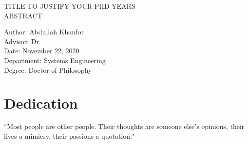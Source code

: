 \documentclass[12pt]{report}
\newcommand{\thesistitle}{TITLE TO JUSTIFY YOUR PHD YEARS}
\newcommand{\thesisname}{Abdullah Khanfor}
\newcommand{\thesischairadvisor}{Dr. }    %
\newcommand{\thesisdepartment}{Systems Engineering}
\newcommand{\thesisdate}{November 22, 2020}
\newcommand{\thesisdegree}{Doctor of Philosophy}
\begin{document}
\newpage
\doublespacing

\begin{center}
    {\thesistitle}\\ 
    {ABSTRACT}\\
    \vspace{.05in}
\end{center}

\vspace{0.4in}
\begin{flushleft}
Author: \thesisname \\
Advisor: \thesischairadvisor \\
Date: \thesisdate \\
Department: \thesisdepartment \\
Degree: \thesisdegree \\
\end{flushleft}
\newpage

\chapter*{Dedication}
\strut \vspace{2in}
\begin{center}
``Most people are other people. Their thoughts are someone else's opinions, their lives a mimicry, their passions a quotation."
    \end{center}
    \vfill \strut
    \newpage
\newpage


\newpage

\setcounter{tocdepth}{3} %

\tableofcontents

\newpage

\listoftables{}
\newpage
\end{document}
